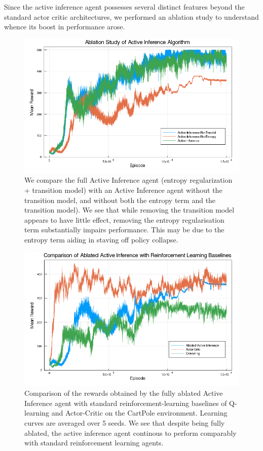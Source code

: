 Since the active inference agent possesses several distinct features beyond the standard actor critic architectures, we performed an ablation study to understand whence its boost in performance arose.

\begin{figure}[H]
    \centering
    \includegraphics[scale=0.4]{chapter_4_figures/ablation_graph.png}
    \caption{We compare the full Active Inference agent (entropy regularization + transition model) with an Active Inference agent without the transition model, and without both the entropy term and the transition model). We see that while removing the transition model appears to have little effect, removing the entropy regularisation term substantially impairs performance. This may be due to the entropy term aiding in staving off policy collapse.}
    \label{Active Inference Ablation}
\end{figure}

\begin{figure}[H]
    \centering
    \includegraphics[scale=0.4]{chapter_4_figures/ablation_comparison_graph.png}
    \caption{Comparison of the rewards obtained by the fully ablated Active Inference agent with standard reinforcement-learning baselines of Q-learning and Actor-Critic on the CartPole environment. Learning curves are averaged over 5 seeds. We see that despite being fully ablated, the active inference agent continous to perform comparably with standard reinforcement learning agents.}
    \label{Ablation Comparison}
\end{figure}

